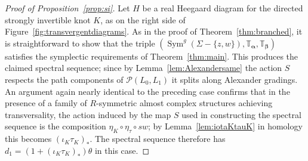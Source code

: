 \documentclass[11pt,reqno]{amsart}
\theoremstyle{definition}
\theoremstyle{remark}
\newcommand{\T}{\mathbb{T}}
\DeclareMathOperator{\Sym}{{Sym}}
\newcommand{\alphas}{\boldsymbol \alpha}
\newcommand{\betas}{\boldsymbol \beta}
\numberwithin{equation}{section}
\begin{document}
\begin{proof} [Proof of Proposition~\ref{prop:si}] Let $H$ be a real Heegaard diagram for the directed strongly invertible knot $K$, as on the right side of Figure~\ref{fig:transvergentdiagrams}. As in the proof of Theorem~\ref{thm:branched}, it is straightforward to show that the triple $(\Sym^g(\Sigma -\{z,w\}), \T_{\alphas}, \T_{\betas})$ satisfies the symplectic requirements of Theorem~\ref{thm:main}. This produces the claimed spectral sequence; since by Lemma~\ref{lem:Alexandersame} the action $S$ respects the path components of $\mathcal P(L_0, L_1)$ it splits along Alexander gradings. An argument again nearly identical to the preceding case confirms that in the presence of a family of $R$-symmetric almost complex structures achieving transversality, the action induced by the map $S$ used in constructing the spectral sequence is the composition $\eta_K \circ \eta_{\tau} \circ sw$; by Lemma~\ref{lem:iotaKtauK} in homology this becomes $(\iota_K \tau_K)_*$. The spectral sequence therefore has $d_1 = (1+(\iota_K \tau_K)_*)\theta$ in this case.
\end{proof}
\end{document}
